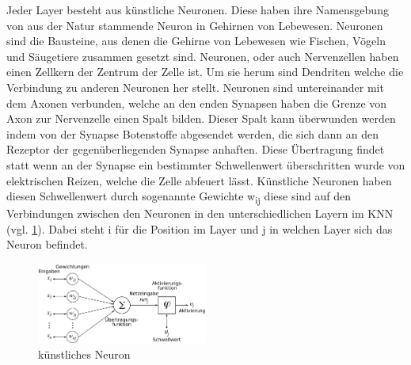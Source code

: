 \documentclass{llncs}
\begin{document}
Jeder Layer besteht aus künstliche Neuronen. Diese haben ihre Namensgebung von aus der Natur stammende Neuron in Gehirnen von Lebewesen. Neuronen sind die Bausteine, aus denen die Gehirne von Lebewesen wie Fischen, Vögeln und Säugetiere zusammen gesetzt sind. Neuronen, oder auch Nervenzellen haben einen Zellkern der Zentrum der Zelle ist. Um sie herum sind Dendriten welche die Verbindung zu anderen Neuronen her stellt. Neuronen sind untereinander mit dem Axonen verbunden, welche an den enden Synapsen haben die Grenze von Axon zur Nervenzelle einen Spalt bilden. Dieser Spalt kann überwunden werden indem von der Synapse Botenstoffe abgesendet werden, die sich dann an den Rezeptor der gegenüberliegenden Synapse anhaften. Diese Übertragung findet statt wenn an der Synapse ein bestimmter Schwellenwert überschritten wurde von elektrischen Reizen, welche die Zelle abfeuert lässt. Künstliche Neuronen haben diesen Schwellenwert durch sogenannte Gewichte w\textsubscript{ij} diese sind auf den Verbindungen zwischen den Neuronen in den unterschiedlichen Layern im KNN (vgl. \ref{fig:Bild2}). Dabei steht i für die Position im Layer und j in welchen Layer sich das Neuron befindet.

\begin{figure}[htbp] 
	\centering
	\includegraphics[width=0.5\textwidth]{Neuron.png}
	\caption{künstliches Neuron}
	\label{fig:Bild2}
\end{figure}
\end{document}
